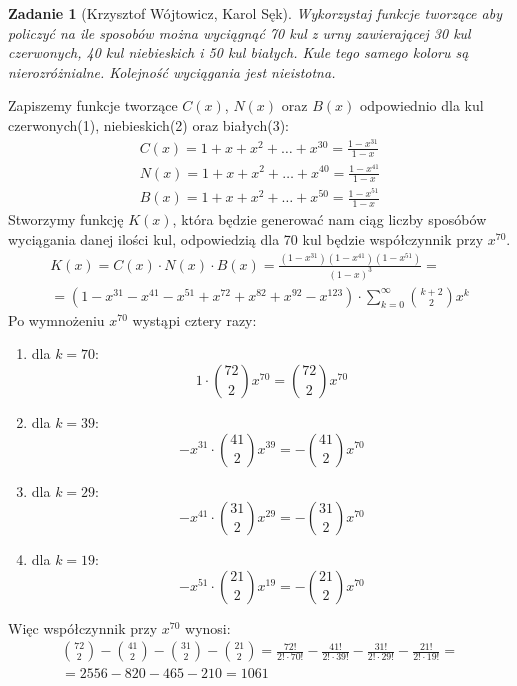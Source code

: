 \documentclass{mwart}
\newtheorem{zad}{Zadanie}[section]
\begin{document}
\begin{zad}[Krzysztof Wójtowicz, Karol Sęk]
    Wykorzystaj funkcje tworzące aby policzyć na ile sposobów można wyciągnąć 70 kul z urny zawierającej 30 kul czerwonych, 40 kul niebieskich i 50 kul białych. Kule tego samego koloru są nierozróżnialne. Kolejność wyciągania jest nieistotna.
\end{zad}
\begin{mdframed}
    Zapiszemy funkcje tworzące $C(x)$, $N(x)$ oraz $B(x)$ odpowiednio dla kul czerwonych(1), niebieskich(2) oraz białych(3):
    \begin{align}
        C(x) = 1 + x + x^2 + \dots + x^{30} = \frac{1 - x^{31}}{1 - x} \\
        N(x) = 1 + x + x^2 + \dots + x^{40} = \frac{1 - x^{41}}{1 - x} \\
        B(x) = 1 + x + x^2 + \dots + x^{50} = \frac{1 - x^{51}}{1 - x}
    \end{align}
    Stworzymy funkcję $K(x)$, która będzie generować nam ciąg liczby sposóbów wyciągania danej ilości kul, odpowiedzią dla 70 kul będzie współczynnik przy $x^{70}$.
    \begin{gather*}
        K(x) = C(x) \cdot N(x) \cdot B(x) = \frac{(1 - x^{31})(1 - x^{41})(1 - x^{51})}{(1 - x)^3} = \\
        = (1 - x^{31} - x^{41} - x^{51} + x^{72} + x^{82} + x^{92} - x^{123}) \cdot \sum_{k=0}^{\infty} \binom{k+2}{2}x^k
    \end{gather*}
    Po wymnożeniu $x^{70}$ wystąpi cztery razy:
    \begin{enumerate}
        \item dla $k = 70$: \[ 1 \cdot \binom{72}{2}x^{70} = \binom{72}{2}x^{70}\]
        \item dla $k = 39$: \[ -x^{31} \cdot \binom{41}{2}x^{39} = -\binom{41}{2}x^{70}\]
        \item dla $k = 29$: \[ -x^{41} \cdot \binom{31}{2}x^{29} = -\binom{31}{2}x^{70}\]
        \item dla $k = 19$: \[ -x^{51} \cdot \binom{21}{2}x^{19} = -\binom{21}{2}x^{70}\]
    \end{enumerate}
    Więc współczynnik przy $x^{70}$ wynosi:
    \begin{gather*}
        \binom{72}{2} - \binom{41}{2} - \binom{31}{2} - \binom{21}{2} = \frac{72!}{2! \cdot 70!} - \frac{41!}{2! \cdot 39!} - \frac{31!}{2! \cdot 29!} - \frac{21!}{2! \cdot 19!} = \\ = 2556 - 820 - 465 - 210 = 1061
    \end{gather*}

\end{mdframed}
\end{document}
